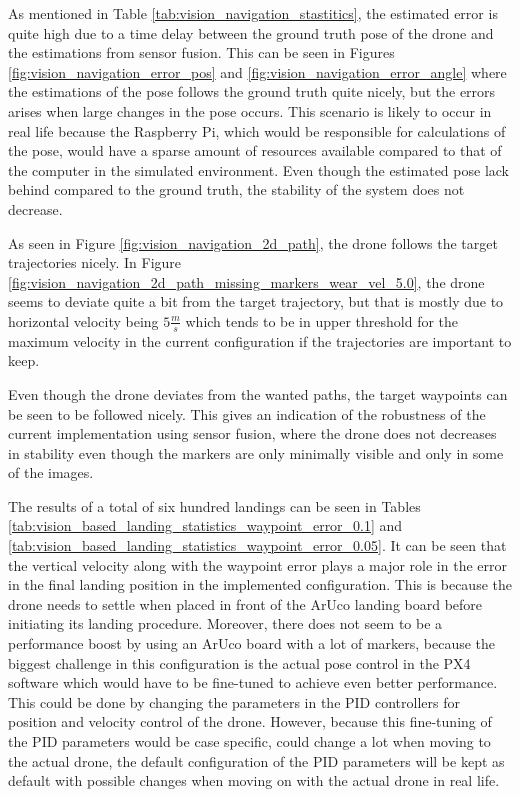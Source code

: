 \documentclass[../Head/report.tex]{subfiles}
\begin{document}
 
As mentioned in Table \ref{tab:vision_navigation_stastitics}, the estimated error is quite high due to a time delay between the ground truth pose of the drone and the estimations from sensor fusion. This can be seen in Figures \ref{fig:vision_navigation_error_pos} and \ref{fig:vision_navigation_error_angle} where the estimations of the pose follows the ground truth quite nicely, but the errors arises when large changes in the pose occurs. This scenario is likely to occur in real life because the Raspberry Pi, which would be responsible for calculations of the pose, would have a sparse amount of resources available compared to that of the computer in the simulated environment. Even though the estimated pose lack behind compared to the ground truth, the stability of the system does not decrease.   

As seen in Figure \ref{fig:vision_navigation_2d_path}, the drone follows the target trajectories nicely. In Figure \ref{fig:vision_navigation_2d_path_missing_markers_wear_vel_5.0}, the drone seems to deviate quite a bit from the target trajectory, but that is mostly due to horizontal velocity being $5 \frac{m}{s}$ which tends to be in upper threshold for the maximum velocity in the current configuration if the trajectories are important to keep. 

Even though the drone deviates from the wanted paths, the target waypoints can be seen to be followed nicely. This gives an indication of the robustness of the current implementation using sensor fusion, where the drone does not decreases in stability even though the markers are only minimally visible and only in some of the images. 

The results of a total of six hundred landings can be seen in Tables \ref{tab:vision_based_landing_statistics_waypoint_error_0.1} and \ref{tab:vision_based_landing_statistics_waypoint_error_0.05}. It can be seen that the vertical velocity along with the waypoint error plays a major role in the error in the final landing position in the implemented configuration. This is because the drone needs to settle when placed in front of the ArUco landing board before initiating its landing procedure. Moreover, there does not seem to be a performance boost by using an ArUco board with a lot of markers, because the biggest challenge in this configuration is the actual pose control in the PX4 software which would have to be fine-tuned to achieve even better performance. This could be done by changing the parameters in the PID controllers for position and velocity control of the drone. However, because this fine-tuning of the PID parameters would be case specific, could change a lot when moving to the actual drone, the default configuration of the PID parameters will be kept as default with possible changes when moving on with the actual drone in real life. 
\end{document}
